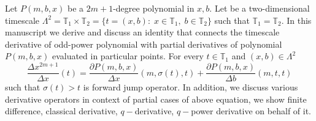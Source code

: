 Let $P(m,b,x)$ be a $2m+1$-degree polynomial in $x,b$.
Let be a two-dimensional timescale
$\Lambda^2 = \mathbb{T}_1 \times \mathbb{T}_2 = \{t=(x, b) \colon \; x\in\mathbb{T}_1, \; b\in\mathbb{T}_2 \}$
such that $\mathbb{T}_1 = \mathbb{T}_2$.
In this manuscript we derive and discuss an identity that connects the timescale derivative of odd-power polynomial
with partial derivatives of polynomial $P(m,b,x)$ evaluated in particular points.
For every $t\in\mathbb{T}_1$ and $(x,b) \in \Lambda^2$
\[
    \frac{\Delta x^{2m+1}}{\Delta x}(t) =
    \frac{\partial P(m,b,x)}{\Delta x} (m, \sigma(t), t) +
    \frac{\partial P(m,b,x)}{\Delta b} (m, t, t)
\]
such that $\sigma(t) > t$ is forward jump operator.
In addition, we discuss various derivative operators in context of partial cases of above equation,
we show finite difference, classical derivative, $q-$derivative, $q-$power derivative on behalf of it.
